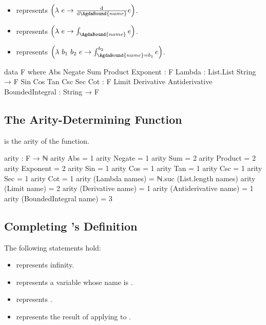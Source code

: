 \documentclass{report}
\begin{document}
\begin{itemize}
{    
  }
  \item {}  represents \(\left(\lambda\ e \rightarrow \derivative{\AgdaBound{name}} e\right)\).
  \item {}  represents \(\left(\lambda\ e \rightarrow \int_{\AgdaBound{name}} e\right)\).
  \item {}  represents \(\left(\lambda\ b_1\ b_2\ e \rightarrow \int_{\AgdaBound{name} = b_1}^{b_2} e\right)\).
\end{itemize}

\begin{code}
  data F where
    Abs
     Negate
     Sum
     Product
     Exponent : F
    Lambda : List.List String → F
    Sin
     Cos
     Tan
     Csc
     Sec
     Cot : F
    Limit
     Derivative
     Antiderivative
     BoundedIntegral : String → F
\end{code}

\subsection{The Arity-Determining Function}
  is the arity of the  function.

\begin{code}
  arity : F → ℕ
  arity Abs = 1
  arity Negate = 1
  arity Sum = 2
  arity Product = 2
  arity Exponent = 2
  arity Sin = 1
  arity Cos = 1
  arity Tan = 1
  arity Csc = 1
  arity Sec = 1
  arity Cot = 1
  arity (Lambda names) = ℕ.suc (List.length names)
  arity (Limit name) = 2
  arity (Derivative name) = 1
  arity (Antiderivative name) = 1
  arity (BoundedIntegral name) = 3
\end{code}

\subsection{Completing 's Definition}
The following statements hold:

\begin{itemize}
  \item {} represents infinity.
  \item {}  represents a variable whose name is .
  \item {}  represents .
  \item {}   represents the result of applying  to .
\end{itemize}
\end{document}
